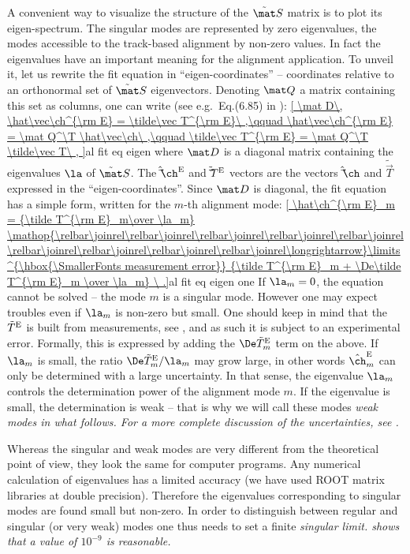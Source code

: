 A convenient way to visualize the structure of the $\tilde\mat S$ matrix is to plot its eigen-spectrum. The singular modes are represented by zero eigenvalues, the modes accessible to the track-based alignment by non-zero values. In fact the eigenvalues have an important meaning for the alignment application. To unveil it, let us rewrite the fit equation  in ``eigen-coordinates'' -- coordinates relative to an orthonormal set of $\tilde\mat S$ eigenvectors. Denoting $\mat Q$ a matrix containing this set as columns, one can write (see e.g.~Eq.(6.85) in ):
\eqref{
	\mat D\, \hat\vec\ch^{\rm E} = \tilde\vec T^{\rm E}\ ,\qquad
	\hat\vec\ch^{\rm E} = \mat Q^\T \hat\vec\ch\ ,\qquad
	\tilde\vec T^{\rm E} = \mat Q^\T \tilde\vec T\ ,
}{al fit eq eigen}
where $\mat D$ is a diagonal matrix containing the eigenvalues $\la$ of $\tilde\mat S$. The $\hat\vec\ch^{\rm E}$ and $\tilde\vec T^{\rm E}$ vectors are the vectors $\hat\vec\ch$ and $\tilde\vec T$ expressed in the ``eigen-coordinates''. Since $\mat D$ is diagonal, the fit equation has a simple form, written for the $m$-th alignment mode:
\eqref{
	\hat\ch^{\rm E}_m = {\tilde T^{\rm E}_m\over \la_m}
	\mathop{\relbar\joinrel\relbar\joinrel\relbar\joinrel\relbar\joinrel\relbar\joinrel\relbar\joinrel\relbar\joinrel\relbar\joinrel\relbar\joinrel\longrightarrow}\limits^{\hbox{\SmallerFonts measurement error}}
	{\tilde T^{\rm E}_m + \De\tilde T^{\rm E}_m \over \la_m}
\ .}{al fit eq eigen one}
If $\la_m = 0$, the equation cannot be solved -- the mode $m$ is a singular mode. However one may expect troubles even if $\la_m$ is non-zero but small. One should keep in mind that the $\tilde T^{\rm E}$ is built from measurements, see , and as such it is subject to an experimental error. Formally, this is expressed by adding the $\De\tilde T^{\rm E}_m$ term on the \rhs{} above. If $\la_m$ is small, the ratio $\De\tilde T^{\rm E}_m/\la_m$ may grow large, in other words $\hat\ch^{\rm E}_m$ can only be determined with a large uncertainty. In that sense, the eigenvalue $\la_m$ controls the determination power of the alignment mode $m$. If the eigenvalue is small, the determination is weak -- that is why we will call these modes \em{weak modes} in what follows. For a more complete discussion of the uncertainties, see .

Whereas the singular and weak modes are very different from the theoretical point of view, they look the same for computer programs. Any numerical calculation of eigenvalues has a limited accuracy (we have used ROOT matrix libraries  at double precision). Therefore the eigenvalues corresponding to singular modes are found small but non-zero. In order to distinguish between regular and singular (or very weak) modes one thus needs to set a finite \em{singular limit}.  shows that a value of $10^{-9}$ is reasonable.

